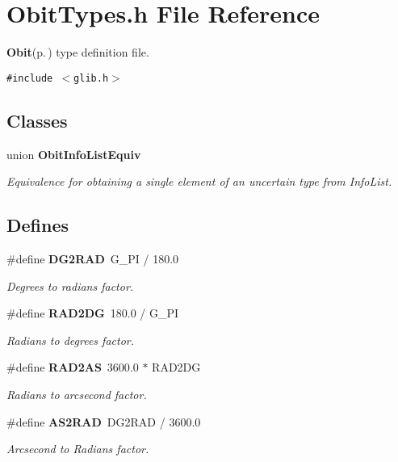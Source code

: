 \section{Obit\-Types.h File Reference}
\label{ObitTypes_8h}
{\bf Obit}{\rm (p.\,\pageref{structObit})} type definition file. 

{\tt \#include $<$glib.h$>$}\par
\subsection*{Classes}
\begin{CompactItemize}
\item 
union {\bf Obit\-Info\-List\-Equiv}
\begin{CompactList}\small\item\em Equivalence for obtaining a single element of an uncertain type from Info\-List. \item\end{CompactList}\end{CompactItemize}
\subsection*{Defines}
\begin{CompactItemize}
\item 
\#define {\bf DG2RAD}\ G\_\-PI / 180.0
\begin{CompactList}\small\item\em Degrees to radians factor. \item\end{CompactList}\item 
\#define {\bf RAD2DG}\ 180.0 / G\_\-PI
\begin{CompactList}\small\item\em Radians to degrees factor. \item\end{CompactList}\item 
\#define {\bf RAD2AS}\ 3600.0 $\ast$ RAD2DG
\begin{CompactList}\small\item\em Radians to arcsecond factor. \item\end{CompactList}\item 
\#define {\bf AS2RAD}\ DG2RAD / 3600.0
\begin{CompactList}\small\item\em Arcsecond to Radians factor. \item\end{CompactList}\end{CompactItemize}
